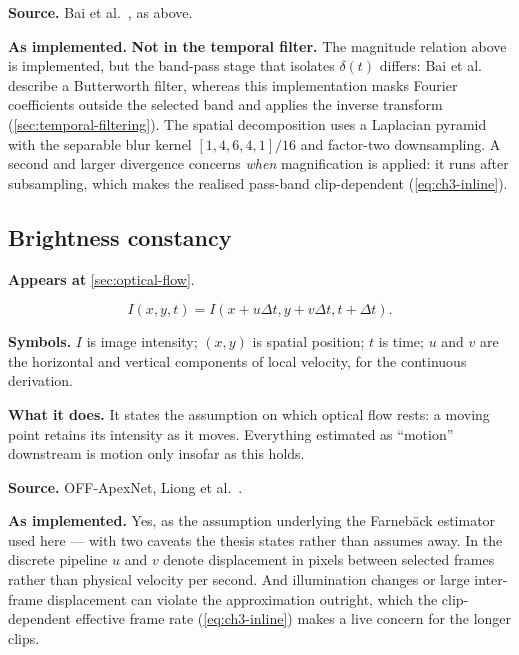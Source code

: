 \textbf{Source.} Bai et al.~\cite{bai2021}, as above.

\textbf{As implemented.} \textbf{Not in the temporal filter.} The magnitude
relation above is implemented, but the band-pass stage that isolates
$\delta(t)$ differs: Bai et al. describe a Butterworth filter, whereas this
implementation masks Fourier coefficients outside the selected band and
applies the inverse transform (\autoref{sec:temporal-filtering}). The spatial
decomposition uses a Laplacian pyramid with the separable blur kernel
$[1,4,6,4,1]/16$ and factor-two downsampling. A second and larger divergence
concerns \emph{when} magnification is applied: it runs after subsampling, which
makes the realised pass-band clip-dependent (\autoref{eq:ch3-inline}).

\subsection{Brightness constancy}
\label{eq:brightness}

\textbf{Appears at} \autoref{sec:optical-flow}.

\[
    I(x,y,t)=I(x+u\Delta t,y+v\Delta t,t+\Delta t).
\]

\textbf{Symbols.} $I$ is image intensity; $(x,y)$ is spatial position; $t$ is
time; $u$ and $v$ are the horizontal and vertical components of local
velocity, for the continuous derivation.

\textbf{What it does.} It states the assumption on which optical flow rests:
a moving point retains its intensity as it moves. Everything estimated as
``motion'' downstream is motion only insofar as this holds.

\textbf{Source.} OFF-ApexNet, Liong et al.~\cite{liong2019a}.

\textbf{As implemented.} Yes, as the assumption underlying the Farneb\"ack
estimator used here --- with two caveats the thesis states rather than
assumes away. In the discrete pipeline $u$ and $v$ denote displacement in
pixels between selected frames rather than physical velocity per second. And
illumination changes or large inter-frame displacement can violate the
approximation outright, which the clip-dependent effective frame rate
(\autoref{eq:ch3-inline}) makes a live concern for the longer clips.

